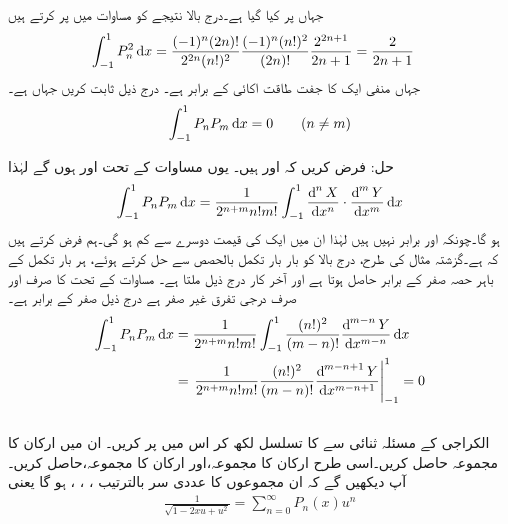 جہاں  پر کیا گیا ہے۔درج بالا نتیجے کو مساوات  میں پر کرتے ہیں
 \begin{align}
\int_{-1}^{1} P_n^2  \dif x&=\frac{(-1)^n (2n)!}{2^{2n}(n!)^2}\frac{(-1)^n(n!)^2}{(2n)!}\frac{2^{2n+1}}{2n+1}=\frac{2}{2n+1}
\end{align}
جہاں منفی ایک کا جفت طاقت اکائی کے برابر  ہے۔
درج ذیل ثابت کریں جہاں  ہے۔
\begin{align}
\int_{-1}^{1}P_nP_m \dif x=0\quad \quad (n \ne m)
\end{align}

حل: فرض کریں کہ  اور  ہیں۔ یوں مساوات  کے تحت
  اور    ہوں گے لہٰذا
\begin{align*}
\int_{-1}^{1}P_n P_m \dif x=\frac{1}{2^{n+m}n!m!}\int_{-1}^{1} \frac{\dif^{\,n}X}{\dif x^n}\cdot \frac{\dif^{\,m}Y}{\dif x^m}\dif x
\end{align*}
ہو گا۔چونکہ  اور  برابر نہیں ہیں لہٰذا ان میں ایک کی قیمت دوسرے سے کم ہو گی۔ہم فرض کرتے ہیں کہ  ہے۔گزشتہ مثال کی طرح، درج بالا کو بار بار تکمل بالحصص سے حل کرتے ہوئے، ہر بار تکمل کے باہر حصہ صفر کے برابر حاصل ہوتا ہے اور آخر کار درج ذیل ملتا ہے۔ مساوات  کے تحت  کا صرف اور صرف  درجی تفرق غیر صفر ہے درج ذیل صفر کے برابر ہے۔
\begin{align*}
\int_{-1}^{1}P_nP_m\dif x&=\frac{1}{2^{n+m}n!m!}\int_{-1}^{1} \frac{(n!)^2}{(m-n)!}\frac{\dif^{\,m-n}Y}{\dif x^{m-n}}\dif x\\
&=\left. \frac{1}{2^{n+m}n!m!} \frac{(n!)^2}{(m-n)!}\frac{\dif^{\,m-n+1}Y}{\dif x^{m-n+1}}\right|_{-1}^{1}=0
\end{align*}
\quad {}\\
الکراجی کے مسئلہ ثنائی سے  کا تسلسل لکھ کر اس میں  پر کریں۔ ان میں  ارکان کا مجموعہ حاصل کریں۔اسی طرح   ارکان کا مجموعہ،اور  ارکان کا مجموعہ،  حاصل کریں۔آپ دیکھیں گے کہ ان مجموعوں کا عددی سر بالترتیب ، ، ،  ہو گا یعنی
\begin{align}\label{مساوات_بیسل_پیداکار_تفاعل_لیژانڈر}
\frac{1}{\sqrt{1-2xu+u^2}}=\sum_{n=0}^{\infty}P_n(x)u^n
\end{align}

